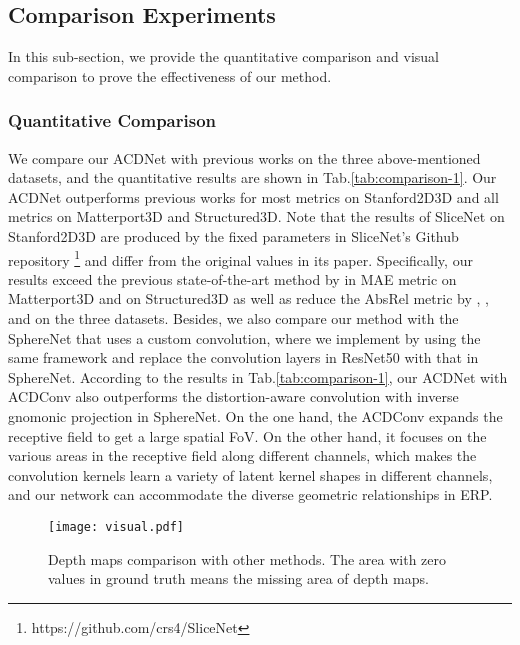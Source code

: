 \documentclass[letterpaper]{article} \usepackage{aaai21}  \usepackage{times}  \usepackage{helvet} \usepackage{courier}  \usepackage[hyphens]{url}  \usepackage{graphicx} \urlstyle{rm} \def\UrlFont{\rm}  \usepackage{natbib}  \usepackage{caption} \frenchspacing  \setlength{\pdfpagewidth}{8.5in}  \setlength{\pdfpageheight}{11in}
\newcommand{\newchange}[1]{{\color{black}#1}}
\begin{document}
\subsection{Comparison Experiments}

In this sub-section, we provide the quantitative comparison and visual comparison to prove the effectiveness of our method.


\subsubsection{Quantitative Comparison}

\newchange{
We compare our ACDNet with previous works on the three above-mentioned datasets, and the quantitative results are shown in Tab.\ref{tab:comparison-1}. Our ACDNet outperforms previous works for most metrics on Stanford2D3D and all metrics on Matterport3D and Structured3D. Note that the results of SliceNet on Stanford2D3D are produced by the fixed parameters in SliceNet's Github repository \footnote{https://github.com/crs4/SliceNet} and differ from the original values in its paper. Specifically, our results exceed the previous state-of-the-art method by  in MAE metric on Matterport3D and  on Structured3D as well as reduce the AbsRel metric by , , and  on the three datasets. Besides, we also compare our method with the SphereNet that uses a custom convolution, where we implement by using the same framework and replace the convolution layers in ResNet50 with that in SphereNet. According to the results in Tab.\ref{tab:comparison-1}, our ACDNet with ACDConv also outperforms the distortion-aware convolution with inverse gnomonic projection in SphereNet. On the one hand, the ACDConv expands the receptive field to get a large spatial FoV. On the other hand, it focuses on the various areas in the receptive field along different channels, which makes the convolution kernels learn a variety of latent kernel shapes in different channels, and our network can accommodate the diverse geometric relationships in ERP.
}



\begin{figure*}[tb]
\centering
  \texttt{[image: visual.pdf]}
  \caption{Depth maps comparison with other methods. The area with zero values in ground truth means the missing area of depth maps.}
  \label{fig:visual}
\end{figure*}
\end{document}
